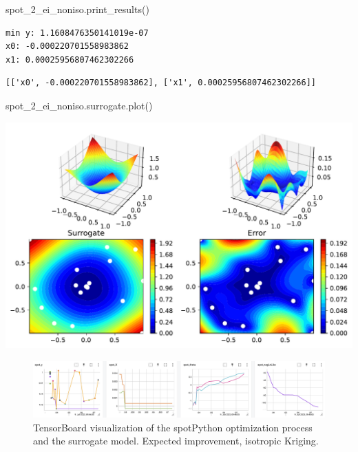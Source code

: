 \documentclass[
  letterpaper,
  DIV=11,
  numbers=noendperiod]{scrreprt}
\newenvironment{Shaded}{\begin{snugshade}}{\end{snugshade}}
\newcommand{\NormalTok}[1]{\textcolor[rgb]{0.00,0.23,0.31}{#1}}
\begin{document}
\begin{Shaded}
\begin{Highlighting}[]
\NormalTok{spot\_2\_ei\_noniso.print\_results()}
\end{Highlighting}
\end{Shaded}

\begin{verbatim}
min y: 1.1608476350141019e-07
x0: -0.000220701558983862
x1: 0.00025956807462302266
\end{verbatim}

\begin{verbatim}
[['x0', -0.000220701558983862], ['x1', 0.00025956807462302266]]
\end{verbatim}

\begin{Shaded}
\begin{Highlighting}[]
\NormalTok{spot\_2\_ei\_noniso.surrogate.plot()}
\end{Highlighting}
\end{Shaded}

\includegraphics{012_num_spot_ei_files/figure-pdf/cell-16-output-1.pdf}

\begin{figure}[H]

{\centering \includegraphics[width=1\textwidth,height=\textheight]{figures_static/07_tensorboard_EI_NONISO.png}

}

\caption{TensorBoard visualization of the spotPython optimization
process and the surrogate model. Expected improvement, isotropic
Kriging.}

\end{figure}%
\end{document}
